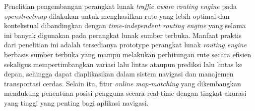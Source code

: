Penelitian pengembangan perangkat lunak \textit{traffic aware routing engine} pada \textit{openstreetmap} dilakukan untuk menghasilkan rute yang lebih optimal dan kontekstual dibandingkan dengan \textit{time-independent routing engine} yang selama ini banyak digunakan pada perangkat lunak sumber terbuka. Manfaat praktis dari penelitian ini adalah tersedianya prototype perangkat lunak \textit{routing engine} berbasis sumber terbuka yang mampu melakukan perhitungan rute secara efisien sekaligus mempertimbangkan variasi lalu lintas ataupun prediksi lalu lintas ke depan, sehingga dapat diaplikasikan dalam sistem navigasi dan manajemen transportasi cerdas. Selain itu, fitur \textit{online map-matching} yang dikembangkan mendukung penentuan posisi pengguna secara real-time dengan tingkat akurasi yang tinggi yang penting bagi aplikasi navigasi. 